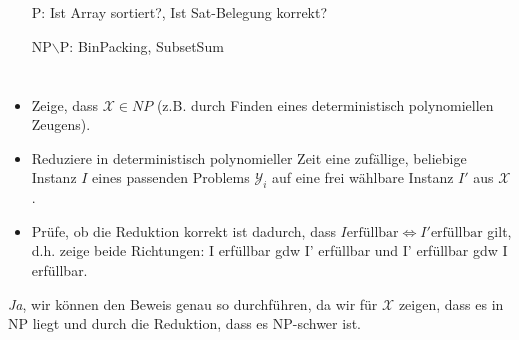 \documentclass{article}
\begin{document}
\section{}%
\begin{center}
\end{center}
\begin{enumerate}
	\item[P:] Ist Array sortiert?, Ist Sat-Belegung korrekt?
  \item[NP$\backslash$P:] BinPacking, SubsetSum
\end{enumerate}

\section{}%
\begin{itemize}
	\item Zeige, dass $\mathcal{X}\in NP$ (z.B. durch Finden eines deterministisch polynomiellen Zeugens).
  \item Reduziere in deterministisch polynomieller Zeit eine zufällige, beliebige Instanz $I$ eines passenden Problems $\mathcal{Y}_i$ auf eine frei wählbare Instanz $I'$ aus $\mathcal{X}$.
  \item Prüfe, ob die Reduktion korrekt ist dadurch, dass $I \text{erfüllbar} \Leftrightarrow I' \text{erfüllbar}$ gilt, d.h. zeige beide Richtungen: I erfüllbar gdw I' erfüllbar und I' erfüllbar gdw I erfüllbar.
\end{itemize}
\emph{Ja}, wir können den Beweis genau so durchführen, da wir für $\mathcal{X}$ zeigen, dass es in NP liegt und durch die Reduktion, dass es NP-schwer ist.
\end{document}
